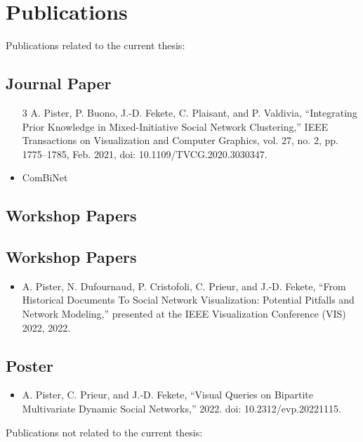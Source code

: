 \chapter*{Publications}

Publications related to the current thesis:

\section*{Journal Paper}

\begin{itemize}
    \item [3] A. Pister, P. Buono, J.-D. Fekete, C. Plaisant, and P. Valdivia, “Integrating Prior Knowledge in Mixed-Initiative Social Network Clustering,” IEEE Transactions on Visualization and Computer Graphics, vol. 27, no. 2, pp. 1775–1785, Feb. 2021, doi: 10.1109/TVCG.2020.3030347.
    \item ComBiNet
\end{itemize}

\section*{Workshop Papers}\section*{Workshop Papers}

\begin{itemize}
    \item A. Pister, N. Dufournaud, P. Cristofoli, C. Prieur, and J.-D. Fekete, “From Historical Documents To Social Network Visualization: Potential Pitfalls and Network Modeling,” presented at the IEEE Visualization Conference (VIS) 2022, 2022.
\end{itemize}


\section*{Poster}

\begin{itemize}
    \item  A. Pister, C. Prieur, and J.-D. Fekete, “Visual Queries on Bipartite Multivariate Dynamic Social Networks,” 2022. doi: 10.2312/evp.20221115.
\end{itemize}



Publications not related to the current thesis:

